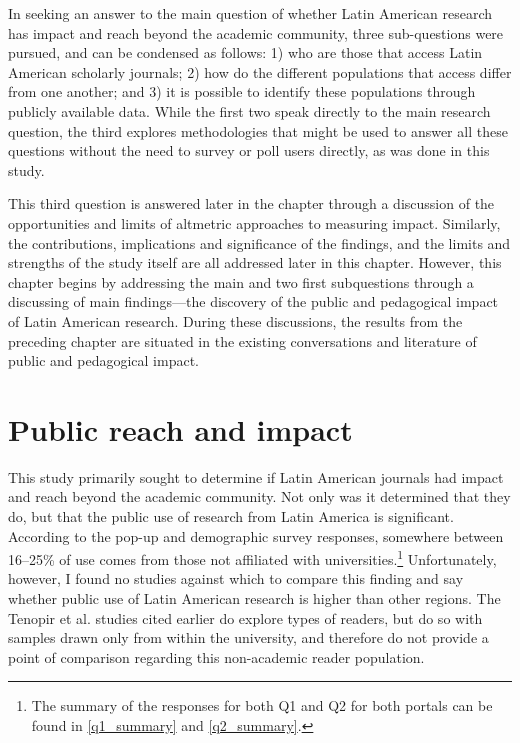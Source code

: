 In seeking an answer to the main question of whether Latin American research has impact and reach beyond the academic community, three sub-questions were pursued, and can be condensed as follows: 1) who are those that access Latin American scholarly journals; 2) how do the different populations that access differ from one another; and 3) it is possible to identify these populations through publicly available data. While the first two speak directly to the main research question, the third explores methodologies that might be used to answer all these questions without the need to survey or poll users directly, as was done in this study.

This third question is answered later in the chapter through a discussion of the opportunities and limits of altmetric approaches to measuring impact. Similarly, the contributions, implications and significance of the findings, and the limits and strengths of the study itself are all addressed later in this chapter. However, this chapter begins by addressing the main and two first subquestions through a discussing of main findings—the discovery of the public and pedagogical impact of Latin American research. During these discussions, the results from the preceding chapter are situated in the existing conversations and literature of public and pedagogical impact.

\section{Public reach and impact}
\label{publicreachandimpact}

This study primarily sought to determine if Latin American journals had impact and reach beyond the academic community. Not only was it determined that they do, but that the public use of research from Latin America is significant. According to the pop-up and demographic survey responses, somewhere between 16--25\% of use comes from those not affiliated with universities.\footnote{The summary of the responses for both Q1 and Q2 for both portals can be found in \autoref{q1_summary} and \autoref{q2_summary}.} Unfortunately, however, I found no studies against which to compare this finding and say whether public use of Latin American research is higher than other regions. The Tenopir et al. studies cited earlier do explore types of readers, but do so with samples drawn only from within the university, and therefore do not provide a point of comparison regarding this non-academic reader population.

